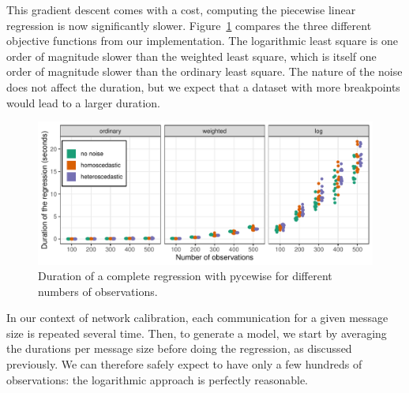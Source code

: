                 This gradient descent comes with a cost, computing the piecewise linear regression is now significantly
                slower. Figure~\ref{fig:prediction:pycewise_duration} compares the three different objective functions
                from our implementation. The logarithmic least square is one order of magnitude slower than the weighted
                least square, which is itself one order of magnitude slower than the ordinary least square. The nature
                of the noise does not affect the duration, but we expect that a dataset with more breakpoints would lead
                to a larger duration.
                \begin{figure}[htpb]
                    \centering
                    \includegraphics[width=\linewidth]{img/prediction/modeling/network/pycewise_duration.pdf}
                    \caption{Duration of a complete regression with pycewise for different numbers of observations.}%
                    \label{fig:prediction:pycewise_duration}
                \end{figure}

                In our context of network calibration, each communication for a given message size is repeated several
                time. Then, to generate a model, we start by averaging the durations per message size before doing the
                regression, as discussed previously. We can therefore safely expect to have only a few hundreds of
                observations: the logarithmic approach is perfectly reasonable.

